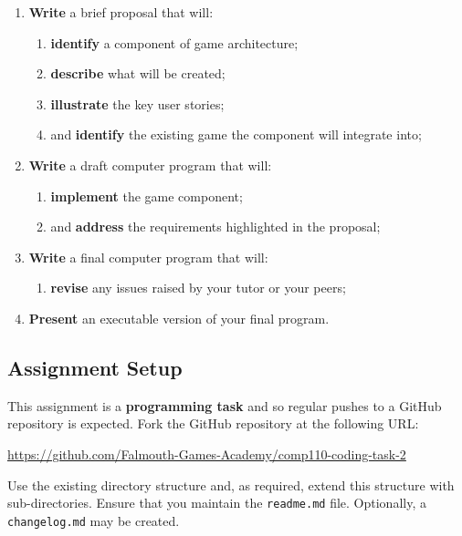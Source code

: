 \documentclass{../fal_assignment}
\begin{document}
\begin{enumerate}[label=(\alph*)]
    \item \textbf{Write} a brief proposal that will:
    	\begin{enumerate}[label=\roman*.]
    		\item \textbf{identify} a component of game architecture;
    		\item \textbf{describe} what will be created;
    		\item \textbf{illustrate} the key user stories;
    		\item and \textbf{identify} the existing game the component will integrate into;
	\end{enumerate}
    \item \textbf{Write} a draft computer program that will:
        	\begin{enumerate}[label=\roman*.]
    		\item \textbf{implement} the game component;
    		\item and \textbf{address} the requirements highlighted in the proposal;
	\end{enumerate}
    \item \textbf{Write} a final computer program that will:
    	\begin{enumerate}[label=\roman*.]
    		\item \textbf{revise} any issues raised by your tutor or your peers;
	\end{enumerate}
    \item \textbf{Present} an executable version of your final program.
\end{enumerate}


\subsection*{Assignment Setup}

This assignment is a \textbf{programming task} and so regular pushes to a GitHub repository is expected. Fork the GitHub repository at the following URL:

\indent \url{https://github.com/Falmouth-Games-Academy/comp110-coding-task-2}

Use the existing directory structure and, as required, extend this structure with sub-directories. Ensure that you maintain the \texttt{readme.md} file. Optionally, a \texttt{changelog.md} may be created.
\end{document}
